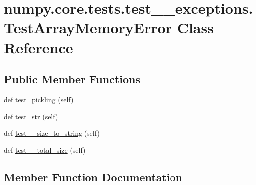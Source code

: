 \hypertarget{classnumpy_1_1core_1_1tests_1_1test____exceptions_1_1TestArrayMemoryError}{}\section{numpy.\+core.\+tests.\+test\+\_\+\+\_\+exceptions.\+Test\+Array\+Memory\+Error Class Reference}
\label{classnumpy_1_1core_1_1tests_1_1test____exceptions_1_1TestArrayMemoryError}
\subsection*{Public Member Functions}
\begin{DoxyCompactItemize}
\item 
def \hyperlink{classnumpy_1_1core_1_1tests_1_1test____exceptions_1_1TestArrayMemoryError_a08b01a938b75bd2e700b1c9b57b92053}{test\+\_\+pickling} (self)
\item 
def \hyperlink{classnumpy_1_1core_1_1tests_1_1test____exceptions_1_1TestArrayMemoryError_aad5aaa63d9131d8e0194d3f2c555d530}{test\+\_\+str} (self)
\item 
def \hyperlink{classnumpy_1_1core_1_1tests_1_1test____exceptions_1_1TestArrayMemoryError_a0d05cbe55688eb4aaf2d9114c90be772}{test\+\_\+\+\_\+size\+\_\+to\+\_\+string} (self)
\item 
def \hyperlink{classnumpy_1_1core_1_1tests_1_1test____exceptions_1_1TestArrayMemoryError_a2313e382d92f78153cf2bdd8e8774225}{test\+\_\+\+\_\+total\+\_\+size} (self)
\end{DoxyCompactItemize}


\subsection{Member Function Documentation}
\mbox{\label{classnumpy_1_1core_1_1tests_1_1test____exceptions_1_1TestArrayMemoryError_a0d05cbe55688eb4aaf2d9114c90be772}} 
